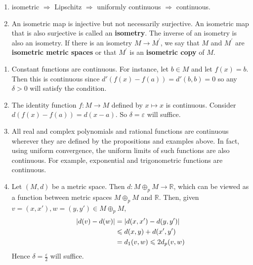 \documentclass[a4paper]{article}
\begin{document}
\begin{note}
    \begin{enumerate}
        \item isometric $\Longrightarrow$ Lipschitz $\Longrightarrow$ uniformly continuous $\Longrightarrow$ continuous.
        \item An isometric map is injective but not necessarily surjective. An isometric map that is also surjective is called an \textbf{isometry}. The inverse of an isometry is also an isometry. If there is an isometry $M \rightarrow M^{\prime}$, we say that $M$ and $M^{\prime}$ are \textbf{isometric metric spaces} or that $M^{\prime}$ is an \textbf{isometric copy} of $M$.
    \end{enumerate}
\end{note}

\begin{example}
	\begin{enumerate}
        \item Constant functions are continuous.
        For instance, let \( b \in M \) and let \( f(x) = b \).
        Then this is continuous since \( d'(f(x) - f(a)) = d'(b,b) = 0 \) so any \( \delta > 0 \) will satisfy the condition.
    
        \item The identity function \( f \colon M \to M \) defined by \( x \mapsto x \) is continuous.
        Consider \( d(f(x) - f(a)) = d(x-a) \).
        So \( \delta = \varepsilon \) will suffice.
    
        \item All real and complex polynomials and rational functions are continuous wherever they are defined by the propositions and examples above.
        In fact, using uniform convergence, the uniform limits of such functions are also continuous.
        For example, exponential and trigonometric functions are continuous.
    
        \item Let \( (M, d) \) be a metric space.
        Then \( d \colon M \oplus_p M \to \mathbb R \), which can be viewed as a function between metric spaces \( M \oplus_p M \) and \( \mathbb R \).
        Then, given \( v = (x,x'), w = (y,y') \in M \oplus_p M \),
        \begin{align*}
            \abs{d(v) - d(w)} &= \abs{d(x,x') - d(y,y')} \\ 
            &\leqslant d(x,y) + d(x',y') \\ 
            &= d_1(v,w) \leqslant 2 d_p(v,w)
        \end{align*}
        Hence \( \delta = \frac{\varepsilon}{2} \) will suffice.


\end{enumerate}
\end{example}
\end{document}

